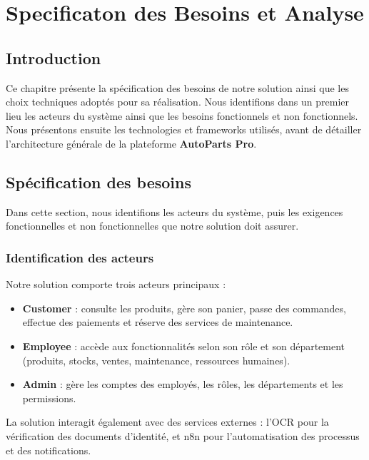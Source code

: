 
\chapter{Specificaton des Besoins et Analyse}

\localtableofcontents
\newpage
\section{Introduction}

Ce chapitre présente la spécification des besoins de notre solution ainsi que les choix techniques adoptés pour sa réalisation. Nous identifions dans un premier lieu les acteurs du système ainsi que les besoins fonctionnels et non fonctionnels. Nous présentons ensuite les technologies et frameworks utilisés, avant de détailler l'architecture générale de la plateforme \textbf{AutoParts Pro}.

\section{Spécification des besoins}

Dans cette section, nous identifions les acteurs du système, puis les exigences fonctionnelles et non fonctionnelles que notre solution doit assurer.

\subsection{Identification des acteurs}

Notre solution comporte trois acteurs principaux :

\begin{itemize}
    \item \textbf{Customer} : consulte les produits, gère son panier, passe des commandes, effectue des paiements et réserve des services de maintenance.
    \item \textbf{Employee} : accède aux fonctionnalités selon son rôle et son département (produits, stocks, ventes, maintenance, ressources humaines).
    \item \textbf{Admin} : gère les comptes des employés, les rôles, les départements et les permissions.
\end{itemize}

La solution interagit également avec des services externes : l'\ac{OCR} pour la vérification des documents d'identité, et n8n pour l'automatisation des processus et des notifications.

